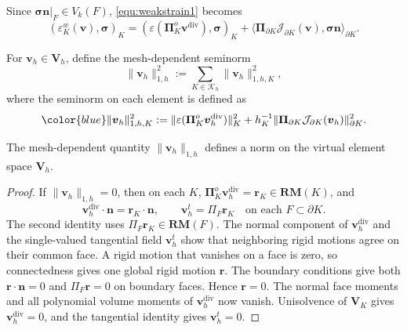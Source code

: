 \documentclass[review,hidelinks,onefignum,onetabnum]{siamart251216}
\newcommand{\AI}[1]{{\color{blue}#1}}
\begin{document}
Since $\boldsymbol\sigma\boldsymbol n|_F\in V_k(F)$, \eqref{equ:weakstrain1} becomes
\[
(\varepsilon_K^w(\boldsymbol{v}), \boldsymbol{\sigma})_K = (\varepsilon(\boldsymbol{\Pi}_K^o \boldsymbol{v}^{\operatorname{div}}), \boldsymbol{\sigma})_K + \langle \boldsymbol{\Pi}_{\partial K} \mathcal{J}_{\partial K}(\boldsymbol{v}), \boldsymbol{\sigma}\boldsymbol{n} \rangle_{\partial K}.
\]


For $\boldsymbol v_h\in\boldsymbol V_h$, define the mesh-dependent seminorm
\[
\|\boldsymbol{v}_h\|_{1,h}^2 := \sum_{K \in \mathcal{K}_h} \|\boldsymbol{v}_h\|_{1,h,K}^2,
\]
where the seminorm on each element is defined as
\[
\AI{\|\boldsymbol{v}_h\|_{1,h,K}^2 := \|\varepsilon (\boldsymbol{\Pi}_K^o \boldsymbol{v}_h^{\operatorname{div}})\|_K^2 + h_K^{-1}\|\boldsymbol{\Pi}_{\partial K}\mathcal{J}_{\partial K}(\boldsymbol{v}_h)\|_{\partial K}^2.}
\]


\begin{lemma}\label{lem:norm}
The mesh-dependent quantity
\(
\|\boldsymbol{v}_h\|_{1,h}
\)
defines a norm on the virtual element space \(\boldsymbol{V}_h\).
\end{lemma}

\AI{\begin{proof}
If $\|\boldsymbol v_h\|_{1,h}=0$, then on each $K$,
$\boldsymbol\Pi_K^o\boldsymbol v_h^{\operatorname{div}}=\boldsymbol r_K
\in\mathbf{RM}(K)$, and
\[
\boldsymbol v_h^{\operatorname{div}}\cdot\boldsymbol n
=\boldsymbol r_K\cdot\boldsymbol n,
\qquad
\boldsymbol v_h^t=\Pi_F\boldsymbol r_K\quad\text{on each }F\subset\partial K.
\]
The second identity uses $\Pi_F\boldsymbol r_K\in\mathbf{RM}(F)$.
The normal component of $\boldsymbol v_h^{\operatorname{div}}$ and the
single-valued tangential field $\boldsymbol v_h^t$ show that neighboring
rigid motions agree on their common face. A rigid motion that vanishes on
a face is zero, so connectedness gives one global rigid motion $\boldsymbol r$.
The boundary conditions give both $\boldsymbol r\cdot\boldsymbol n=0$ and
$\Pi_F\boldsymbol r=0$ on boundary faces. Hence $\boldsymbol r=0$.
The normal face moments and all polynomial volume moments of
$\boldsymbol v_h^{\operatorname{div}}$ now vanish. Unisolvence of
$\boldsymbol V_K$ gives $\boldsymbol v_h^{\operatorname{div}}=0$,
and the tangential identity gives $\boldsymbol v_h^t=0$.
\end{proof}}
\end{document}
